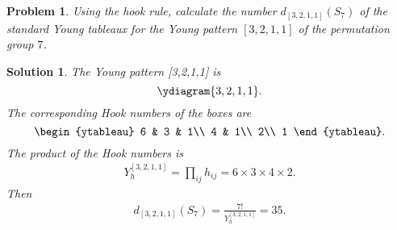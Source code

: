 \documentclass[UTF8,10pt,a4paper]{article}
\theoremstyle{Problem}
\newtheorem{prob}{Problem}
\theoremstyle{Solution}
\newtheorem*{sol}{Solution}
\begin{document}
\begin{prob}
    Using the hook rule, calculate the number $d_{[3,2,1,1]}(S_7)$ of the standard Young tableaux for the Young pattern $[3,2,1,1]$ of the permutation group $7$.
\end{prob}
\begin{sol}
    The Young pattern [3,2,1,1] is
    \[
        \ydiagram{3,2,1,1}.
    \]
    The corresponding Hook numbers of the boxes are
    \[
        \begin{ytableau}
            6 & 3 & 1\\
            4 & 1\\
            2\\
            1
        \end{ytableau}.
    \]
    The product of the Hook numbers is
    \begin{align}
        Y_h^{[3,2,1,1]}=\prod_{ij}h_{ij}=6\times 3\times 4\times 2.
    \end{align}
    Then
    \begin{align}
        d_{[3,2,1,1]}(S_7)=\frac{7!}{Y_h^{[3,2,1,1]}}=35.
    \end{align}
\end{sol}
\end{document}
